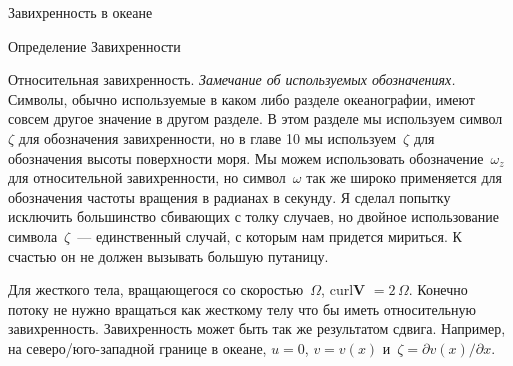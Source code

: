 \begin{chapter}{Завихренность в океане}
\begin{section}{Определение Завихренности}
\begin{paragraph}{Относительная завихренность.}
\emph{Замечание об используемых обозначениях.} Символы, обычно
используемые в каком либо разделе океанографии, имеют совсем другое
значение в другом разделе. В этом разделе мы используем символ~$\zeta$
для обозначения завихренности, но в главе 10 мы используем~$\zeta$ для
обозначения высоты поверхности моря. Мы можем использовать
обозначение~$\omega_z$ для относительной завихренности, но
символ~$\omega$ так же широко применяется для обозначения частоты
вращения в радианах в секунду. Я сделал попытку исключить большинство
сбивающих с толку случаев, но двойное использование
символа~$\zeta$~--- единственный случай, с которым нам придется
мириться. К счастью он не должен вызывать большую путаницу.
%

Для жесткого тела, вращающегося со скоростью~$\Omega$, curl\textbf{V}
$= 2\,\Omega$. Конечно потоку не нужно вращаться как жесткому телу что
бы иметь относительную завихренность. Завихренность может быть так же
результатом сдвига. Например, на северо/юго-западной границе в океане,
$u=0$, $v=v(x)$ и~$\zeta = \partial{v(x)}/\partial{x}$.
%


\end{paragraph}
\end{section}
\end{chapter}
